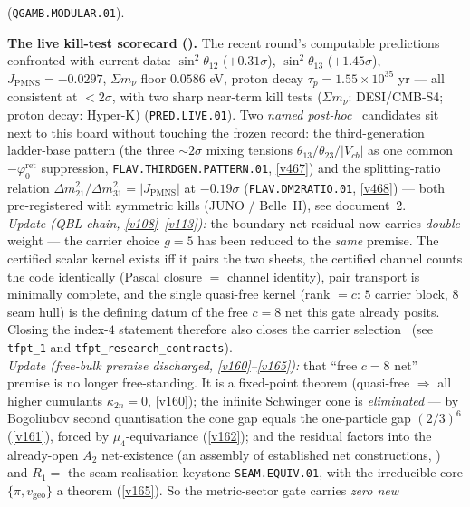 \documentclass[11pt,a4paper]{article}
\newcommand{\phiz}{\varphi_0^{\mathrm{ret}}}
\begin{document}
\begin{keybox}
(\texttt{QGAMB.MODULAR.01}).
\par\smallskip\noindent\textbf{The live kill-test scorecard ().} The
recent round's computable predictions confronted with current data: $\sin^2\theta_{12}$ ($+0.31\sigma$),
$\sin^2\theta_{13}$ ($+1.45\sigma$), $J_{\mathrm{PMNS}}{=}{-}0.0297$, $\Sigma m_\nu$ floor $0.0586$ eV,
proton decay $\tau_p{=}1.55{\times}10^{35}$ yr --- all consistent at $<2\sigma$, with two sharp near-term kill
tests ($\Sigma m_\nu$: DESI/CMB-S4; proton decay: Hyper-K) (\texttt{PRED.LIVE.01}). Two \emph{named post-hoc}
\mO\ candidates sit next to this board without touching the frozen record: the third-generation ladder-base
pattern (the three ${\sim}2\sigma$ mixing tensions $\theta_{13}/\theta_{23}/|V_{cb}|$ as one common $-\phiz$
suppression, \texttt{FLAV.THIRDGEN.PATTERN.01}, \vref{v467}) and the splitting-ratio relation
$\Delta m^2_{21}/\Delta m^2_{31}=|J_{\mathrm{PMNS}}|$ at $-0.19\sigma$ (\texttt{FLAV.DM2RATIO.01}, \vref{v468})
--- both pre-registered with symmetric kills (JUNO / Belle~II), see document~2.
\smallskip\\
\noindent\emph{Update (QBL chain, \vref{v108}--\vref{v113}):} the boundary-net residual now carries \emph{double}
weight --- the carrier choice $g=5$ has been reduced to the \emph{same} premise. The certified scalar
kernel exists iff it pairs the two sheets, the certified channel counts the code identically (Pascal
closure $=$ channel identity), pair transport is minimally complete, and the single quasi-free kernel
(rank $=c$: $5$ carrier block, $8$ seam hull) is the defining datum of the free $c=8$ net this gate
already posits. Closing the index-$4$ statement therefore also closes the carrier selection \mE\
(see \texttt{tfpt\_1} and \texttt{tfpt\_research\_contracts}). 
\smallskip\\
\noindent\emph{Update (free-bulk premise discharged, \vref{v160}--\vref{v165}):} that ``free $c{=}8$ net''
premise is no longer free-standing. It is a fixed-point theorem (quasi-free $\Rightarrow$ all higher
cumulants $\kappa_{2n}{=}0$, \vref{v160}); the infinite Schwinger cone is \emph{eliminated} --- by
Bogoliubov second quantisation the cone gap equals the one-particle gap $(2/3)^6$ (\vref{v161}), forced by
$\mu_4$-equivariance (\vref{v162}); and the residual factors into the already-open $A_2$ net-existence (an
assembly of established net constructions, \mC) and $R_1=$ the seam-realisation keystone \texttt{SEAM.EQUIV.01}, with the irreducible core
$\{\pi,v_{\mathrm{geo}}\}$ a theorem (\vref{v165}). So the metric-sector gate carries \emph{zero new}

\end{keybox}
\end{document}
